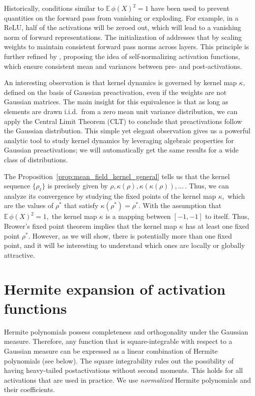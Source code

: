 \documentclass[twoside]{article}
\newcommand{\E}{\mathbb{E}\,}
\theoremstyle{definition}
\begin{document}
Historically, conditions similar to $\E \phi(X)^2=1$ have been used to prevent quantities on the forward pass from vanishing or exploding. For example, in a ReLU, half of the activations will be zeroed out, which will lead to a vanishing norm of forward representations. The initialization of
\citep{he2016deep} addresses that by scaling weights to maintain consistent forward pass norms across layers. This principle is further refined by \citet{klambauer2017self}, proposing the idea of self-normalizing activation functions, which ensure consistent mean and variances between pre- and post-activations. 

An interesting observation is that kernel dynamics is governed by kernel map $\kappa,$ defined on the basis of Gaussian preactivation, even if the weights are not Gaussian matrices. The main insight for this equivalence is that as long as elements are drawn i.i.d.~from a zero mean unit variance distribution, we can apply the Central Limit Theorem (CLT) to conclude that preactivations follow the Gaussian distribution. This simple yet elegant observation gives us a powerful analytic tool to study kernel dynamics by leveraging algebraic properties for Gaussian preactivations; we will automatically get the same results for a wide class of distributions. 

The Proposition~\ref{prop:mean_field_kernel_general} tells us that the kernel sequence $\{\rho_\ell\}$ is precisely given by $\rho,\kappa(\rho),\kappa(\kappa(\rho)),\dots\,.$ Thus, we can analyze its convergence by studying the fixed points of the kernel map $\kappa,$
which are the values of $\rho^*$ that satisfy $\kappa(\rho^*) = \rho^*.$  With the assumption that $\E \phi(X)^2=1,$ the kernel map $\kappa$ is a mapping between $[-1,-1]$ to itself. Thus, Brower's fixed point theorem implies that the kernel map $\kappa$ has at least one fixed point $\rho^*.$ However, as we will show, there is potentially more than one fixed point, and it will be interesting to understand which ones are locally or globally attractive. 


\section{Hermite expansion of activation functions}
Hermite polynomials possess completeness and orthogonality under the Gaussian measure. Therefore, any function that is square-integrable with respect to a Gaussian measure can be expressed as a linear combination of Hermite polynomials (see below). The square integrability rules out the possibility of having heavy-tailed postactivations without second moments. This holds for all activations that are used in practice. We use \emph{normalized} Hermite polynomials and their coefficients. 
\end{document}
